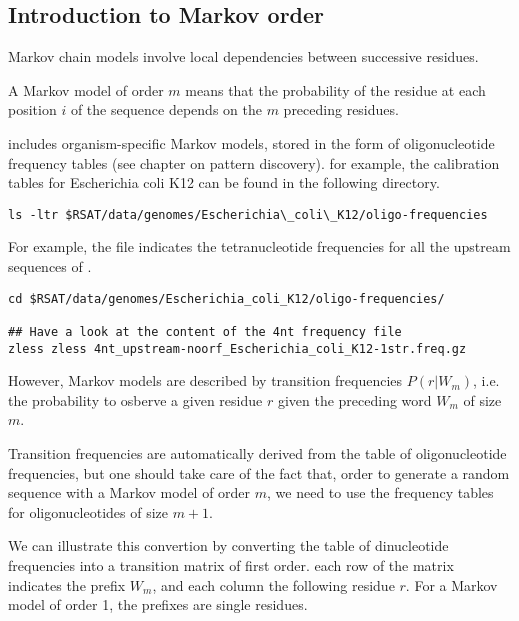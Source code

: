 \subsection{Introduction to Markov order}

Markov chain models involve local dependencies between successive
residues.

A Markov model of order $m$ means that the
probability of the residue at each position $i$ of the sequence
depends on the $m$ preceding residues.

\RSAT includes organism-specific Markov models, stored in the form of
oligonucleotide frequency tables (see chapter on pattern
discovery). for example, the calibration tables for Escherichia coli
K12 can be found in the following directory.

\begin{small}
\begin{verbatim}
ls -ltr $RSAT/data/genomes/Escherichia\_coli\_K12/oligo-frequencies
\end{verbatim}
\end{small}

For example, the file
indicates the tetranucleotide frequencies for all the upstream
sequences of .

\begin{small}
\begin{verbatim}
cd $RSAT/data/genomes/Escherichia_coli_K12/oligo-frequencies/

## Have a look at the content of the 4nt frequency file
zless zless 4nt_upstream-noorf_Escherichia_coli_K12-1str.freq.gz

\end{verbatim}
\end{small}

However, Markov models are described by transition frequencies
$P(r|W_m)$, i.e. the probability to osberve a given residue $r$ given
the preceding word $W_m$ of size $m$.

Transition frequencies are automatically derived from the table of
oligonucleotide frequencies, but one should take care of the fact
that, order to generate a random sequence with a Markov model of order
$m$, we need to use the frequency tables for oligonucleotides of size
$m+1$.

We can illustrate this convertion by converting the table of
dinucleotide frequencies into a transition matrix of first order. each
row of the matrix indicates the prefix $W_m$, and each column the
following residue $r$. For a Markov model of order 1, the prefixes are
single residues.

